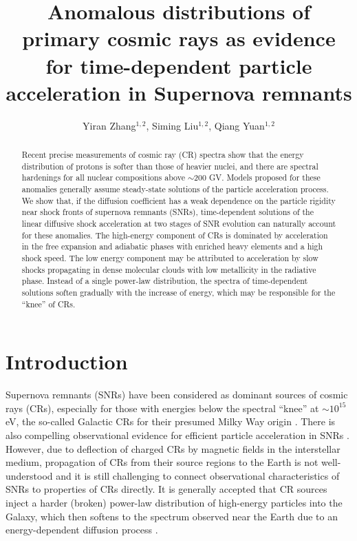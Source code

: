 \documentclass[apj]{emulateapj}
\begin{document}
\title{Anomalous distributions of primary cosmic rays as evidence for time-dependent particle acceleration in Supernova remnants}
\author{Yiran Zhang$^{1,2}$, Siming Liu$^{1,2}$, Qiang Yuan$^{1,2}$}
\begin{abstract}
Recent precise measurements of cosmic ray (CR) spectra show that the 
energy distribution of protons is softer than those of heavier nuclei, 
and there are spectral hardenings for all nuclear compositions above 
$\sim$200 GV. Models proposed for these anomalies generally assume 
steady-state solutions of the particle acceleration process. 
We show that, if the diffusion coefficient has a weak dependence on the 
particle rigidity near shock fronts of supernova remnants (SNRs), time-dependent solutions of the linear diffusive shock acceleration at two stages of SNR evolution can naturally 
account for these anomalies. The high-energy component of CRs is dominated by acceleration in the free expansion and adiabatic phases with enriched heavy elements and a high shock speed. The low energy component may be attributed to acceleration by slow shocks propagating in dense molecular clouds with low metallicity in the radiative phase. 
Instead of a single power-law distribution, the spectra of time-dependent 
solutions soften gradually with the increase of energy, which may be
responsible for the ``knee'' of CRs.
\end{abstract}
\section{Introduction}\label{sec1}
Supernova remnants (SNRs) have been considered as dominant sources of cosmic rays (CRs), especially for those with energies below the spectral ``knee'' at $\sim 10^{15}$ eV, the so-called Galactic CRs for their presumed Milky Way origin \citep{Hillas05,Ohira16}. There is also compelling observational evidence for efficient particle acceleration in SNRs \citep{Helder2012}. However, due to deflection of charged CRs by magnetic fields in the interstellar medium, propagation of CRs from their source regions to the Earth is not well-understood and it is still challenging to connect observational characteristics of SNRs to properties of CRs directly. It is generally accepted that CR sources inject a harder (broken) power-law distribution of high-energy particles into the Galaxy, which then softens to the spectrum observed near the Earth due to an energy-dependent diffusion process \citep{2012ApJ...761..133Y}. 
\end{document}
